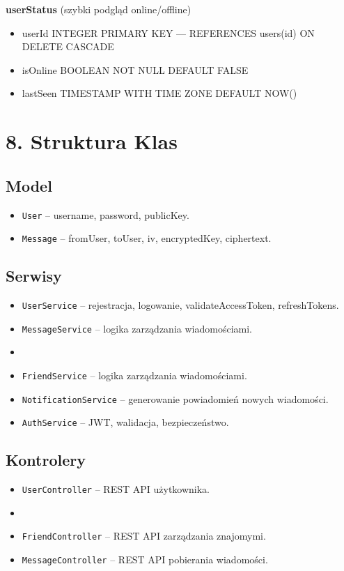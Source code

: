 \documentclass[a4paper,12pt]{article}
\begin{document}
\textbf{userStatus} (szybki podgląd online/offline)
\begin{itemize}
    \item userId INTEGER PRIMARY KEY — REFERENCES users(id) ON DELETE CASCADE
    \item isOnline BOOLEAN NOT NULL DEFAULT FALSE
    \item lastSeen TIMESTAMP WITH TIME ZONE DEFAULT NOW()
\end{itemize}



\section*{8. Struktura Klas}

\vspace{0.5 cm}
 \noindent
\vspace{0.5 cm}
 \noindent
\subsection*{Model}
\begin{itemize}
    \item \texttt{User} – username, password, publicKey.
    \item \texttt{Message} – fromUser, toUser, iv, encryptedKey, ciphertext.
\end{itemize}

\subsection*{Serwisy}
\begin{itemize}
    \item \texttt{UserService} – rejestracja, logowanie, validateAccessToken, refreshTokens.
    \item \texttt{MessageService} – logika zarządzania wiadomościami.
    \item \item \texttt{FriendService} – logika zarządzania wiadomościami.
    \item \texttt{NotificationService} – generowanie powiadomień nowych wiadomości.
    \item \texttt{AuthService} – JWT, walidacja, bezpieczeństwo.
\end{itemize}

\subsection*{Kontrolery}
\begin{itemize}
    \item \texttt{UserController} – REST API użytkownika.
    \item \item \texttt{FriendController} – REST API zarządzania znajomymi.
    \item \texttt{MessageController} – REST API pobierania wiadomości.
\end{itemize}
\end{document}
